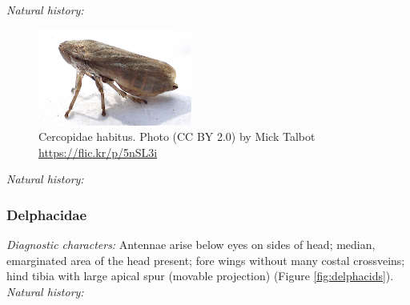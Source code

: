 \documentclass[letterpaper, 11pt]{article}
\begin{document}
\noindent{}\textit{Natural history:} \\

\begin{figure}[ht!]
 \centering
 \includegraphics[width=0.45\textwidth]{CercopidHabitus}
 \caption{Cercopidae habitus. Photo (CC BY 2.0) by Mick Talbot \url{https://flic.kr/p/5nSL3i}}
 \label{fig:cercopid}
\end{figure}

\noindent{}\textit{Natural history:} \\

\subsubsection{Delphacidae}
\noindent{}\textit{Diagnostic characters:} Antennae arise below eyes on sides of head; median, emarginated area of the head present; fore wings without many costal crossveins; hind tibia with large apical spur (movable projection) (Figure \ref{fig:delphacids}).\\

\noindent{}\textit{Natural history:} \\
\end{document}
